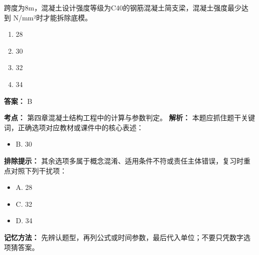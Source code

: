 \documentclass[UTF8,fontset=fandol,11pt]{ctexart}
\begin{document}
\vspace{0.2em}

\begin{quizbox}[title={第 39 题}]
跨度为8m，混凝土设计强度等级为C40的钢筋混凝土简支梁，混凝土强度最少达到 N/mm²时才能拆除底模。\\
\begin{enumerate}[label=\Alph*.]
\item 28
\item 30
\item 32
\item 34
\end{enumerate}
\textbf{答案：} B
\vspace{0.25em}
\begin{answerbox}[title={考点解析}]
\textbf{考点：} 第四章混凝土结构工程中的计算与参数判定。
\textbf{解析：} 本题应抓住题干关键词，正确选项对应教材或课件中的核心表述：
\begin{itemize}
\item B. 30
\end{itemize}
\textbf{排除提示：} 其余选项多属于概念混淆、适用条件不符或责任主体错误，复习时重点对照下列干扰项：
\begin{itemize}
\item A. 28
\item C. 32
\item D. 34
\end{itemize}
\textbf{记忆方法：} 先辨认题型，再列公式或时间参数，最后代入单位；不要只凭数字选项猜答案。
\end{answerbox}
\end{quizbox}

\vspace{0.2em}
\end{document}

